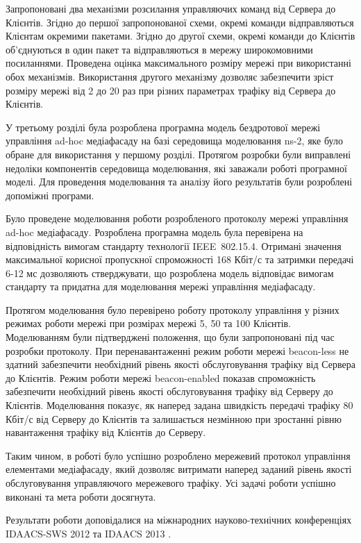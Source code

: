 \documentclass[a4paper,ukrainian,utf8,nocolumnsxix,nocolumnxxxii,nocolumnxxxi,floatsection,equationsection]{eskdtext}
\newcommand{\iee}[0]{IEEE~802.15.4\xspace}
\newcommand{\blm}[0]{beacon-less\xspace}
\newcommand{\bem}[0]{beacon-enabled\xspace}
\begin{document}
Запропоновані два механізми розсилання управляючих команд від Сервера до Клієнтів. Згідно до першої запропонованої схеми, окремі команди відправляються Клієнтам окремими пакетами. Згідно до другої схеми, окремі команди до Клієнтів об’єднуються в один пакет та відправляються в мережу широкомовними посиланнями. Проведена оцінка максимального розміру мережі при використанні обох механізмів. Використання другого механізму дозволяє забезпечити зріст розміру мережі від 2 до 20 раз при різних параметрах трафіку від Сервера до Клієнтів.

У третьому розділі була розроблена програмна модель бездротової мережі управління ad-hoc медіафасаду на базі середовища моделювання ns-2, яке було обране для використання у першому розділі. Протягом розробки були виправлені недоліки компонентів середовища моделювання, які заважали роботі програмної моделі. Для проведення моделювання та аналізу його результатів були розроблені допоміжні програми. 

Було проведене моделювання роботи розробленого протоколу мережі управління ad-hoc медіафасаду. Розроблена програмна модель була перевірена на відповідність вимогам стандарту технології \iee. Отримані значення максимальної корисної пропускної спроможності 168 Кбіт/с та затримки передачі 6-12 мс дозволяють стверджувати, що розроблена модель відповідає вимогам стандарту та придатна для моделювання мережі управління медіафасаду. 

Протягом моделювання було перевірено роботу протоколу управління у різних режимах роботи мережі при розмірах мережі 5, 50 та 100 Клієнтів. Моделюванням були підтверджені положення, що були запропоновані під час розробки протоколу. При перенавантаженні режим роботи мережі \blm не здатний забезпечити необхідний рівень якості обслуговування трафіку від Сервера до Клієнтів. Режим роботи мережі \bem показав спроможність забезпечити необхідний рівень якості обслуговування трафіку від Серверу до Клієнтів. Моделювання показує, як наперед задана швидкість передачі трафіку 80 Кбіт/с від Серверу до Клієнтів та залишається незмінною при зростанні рівню навантаження трафіку від Клієнтів до Серверу.

Таким чином, в роботі було успішно розроблено мережевий протокол управління елементами медіафасаду, який дозволяє витримати наперед заданий рівень якості обслуговування управляючого мережевого трафіку. Усі задачі роботи успішно виконані та мета роботи досягнута.

Результати роботи доповідалися на міжнародних науково-технічних конференціях IDAACS-SWS 2012 та IDAACS 2013 \cite{idaacs:2013:adhoc:media:facade,idaacs:2012:media:facade}.
\end{document}
